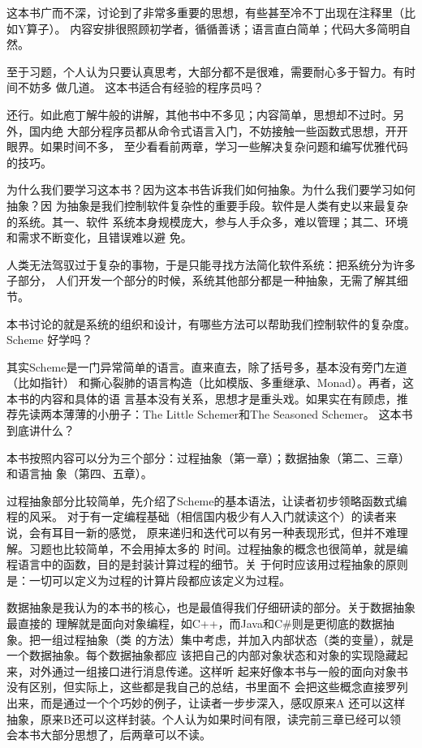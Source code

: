 \documentclass[11pt]{article}
\begin{document}
这本书广而不深，讨论到了非常多重要的思想，有些甚至冷不丁出现在注释里（比如Y算子）。
内容安排很照顾初学者，循循善诱；语言直白简单；代码大多简明自然。

至于习题，个人认为只要认真思考，大部分都不是很难，需要耐心多于智力。有时间不妨多
做几道。 这本书适合有经验的程序员吗？

还行。如此庖丁解牛般的讲解，其他书中不多见；内容简单，思想却不过时。另外，国内绝
大部分程序员都从命令式语言入门，不妨接触一些函数式思想，开开眼界。如果时间不多，
至少看看前两章，学习一些解决复杂问题和编写优雅代码的技巧。

为什么我们要学习这本书？因为这本书告诉我们如何抽象。为什么我们要学习如何抽象？因
为抽象是我们控制软件复杂性的重要手段。软件是人类有史以来最复杂的系统。其一、软件
系统本身规模庞大，参与人手众多，难以管理；其二、环境和需求不断变化，且错误难以避
免。

人类无法驾驭过于复杂的事物，于是只能寻找方法简化软件系统：把系统分为许多子部分，
人们开发一个部分的时候，系统其他部分都是一种抽象，无需了解其细节。

本书讨论的就是系统的组织和设计，有哪些方法可以帮助我们控制软件的复杂度。 Scheme
好学吗？

其实Scheme是一门异常简单的语言。直来直去，除了括号多，基本没有旁门左道（比如指针）
和撕心裂肺的语言构造（比如模版、多重继承、Monad）。再者，这本书的内容和具体的语
言基本没有关系，思想才是重头戏。如果实在有顾虑，推荐先读两本薄薄的小册子：The
Little Schemer和The Seasoned Schemer。 这本书到底讲什么？

本书按照内容可以分为三个部分：过程抽象（第一章）；数据抽象（第二、三章）和语言抽
象（第四、五章）。

过程抽象部分比较简单，先介绍了Scheme的基本语法，让读者初步领略函数式编程的风采。
对于有一定编程基础（相信国内极少有人入门就读这个）的读者来说，会有耳目一新的感觉，
原来递归和迭代可以有另一种表现形式，但并不难理解。习题也比较简单，不会用掉太多的
时间。过程抽象的概念也很简单，就是编程语言中的函数，目的是封装计算过程的细节。关
于何时应该用过程抽象的原则是：一切可以定义为过程的计算片段都应该定义为过程。

数据抽象是我认为的本书的核心，也是最值得我们仔细研读的部分。关于数据抽象最直接的
理解就是面向对象编程，如C++，而Java和C\#则是更彻底的数据抽象。把一组过程抽象（类
的方法）集中考虑，并加入内部状态（类的变量），就是一个数据抽象。每个数据抽象都应
该把自己的内部对象状态和对象的实现隐藏起来，对外通过一组接口进行消息传递。这样听
起来好像本书与一般的面向对象书没有区别，但实际上，这些都是我自己的总结，书里面不
会把这些概念直接罗列出来，而是通过一个个巧妙的例子，让读者一步步深入，感叹原来A
还可以这样抽象，原来B还可以这样封装。个人认为如果时间有限，读完前三章已经可以领
会本书大部分思想了，后两章可以不读。
\end{document}
